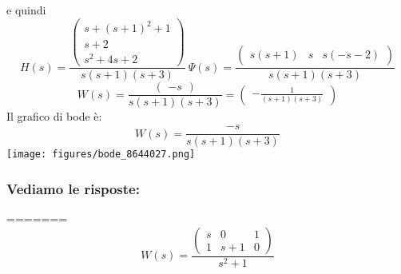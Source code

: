 \documentclass{article}
\begin{document}
e quindi \[ H(s)  =  \frac{\left(\begin{matrix}s + \left(s + 1\right)^{2} + 1\\s + 2\\s^{2} + 4 s + 2\end{matrix}\right)}{s \left(s + 1\right) \left(s + 3\right)} \ \Psi(s) = \frac{\left(\begin{matrix}s \left(s + 1\right) & s & s \left(- s - 2\right)\end{matrix}\right)}{s \left(s + 1\right) \left(s + 3\right)} \]
\[ W(s)  =  \frac{\left(\begin{matrix}- s\end{matrix}\right)}{s \left(s + 1\right) \left(s + 3\right)} = \left(\begin{matrix}- \frac{1}{\left(s + 1\right) \left(s + 3\right)}\end{matrix}\right)  \] 
Il grafico di bode è:
\[ W(s) = \frac{- s}{s \left(s + 1\right) \left(s + 3\right)} \]\texttt{[image: figures/bode\_8644027.png]}


\subsubsection{Vediamo le risposte:} 

=======
\[ W(s) = \frac{\left(\begin{matrix}s & 0 & 1\\1 & s + 1 & 0\end{matrix}\right)}{s^{2} + 1} \]
\end{document}
